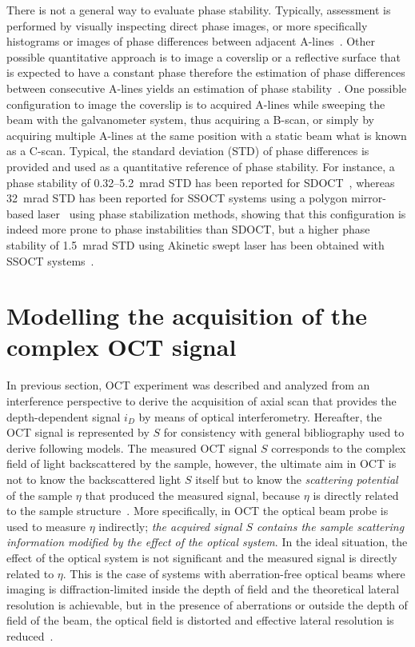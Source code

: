 There is not a general way to evaluate phase stability. Typically, assessment is performed by visually inspecting direct phase images, or more specifically histograms or images of phase differences between adjacent A-lines~\cite{Minneman2015_Akinetik}. Other possible quantitative approach is to image a coverslip or a reflective surface that is expected to have a constant phase therefore the estimation of phase differences between consecutive A-lines yields an estimation of phase stability~\cite{Minneman2015_Akinetik}. One possible configuration to image the coverslip is to acquired A-lines while sweeping the beam with the galvanometer system, thus acquiring a B-scan, or simply by acquiring multiple A-lines at the same position with a static beam what is known as a C-scan. Typical, the standard deviation (STD) of phase differences is provided and used as a quantitative reference of phase stability. For instance, a phase stability of 0.32–5.2~mrad STD has been reported for SDOCT~\cite{White2003_vivo, Joo2005_Spectraldomain}, whereas 32~mrad STD has been reported for SSOCT systems using a polygon mirror-based laser~\cite{Manapuram2009_Phasesensitive} using phase stabilization methods, showing that this configuration is indeed more prone to phase instabilities than SDOCT, but a higher phase stability of 1.5~mrad STD using Akinetic swept laser has been obtained with SSOCT systems~\cite{Choi2013_Phasesensitive}.

\section{Modelling the acquisition of the complex OCT signal}\label{Model}

In previous section, OCT experiment was described and analyzed from an interference perspective to derive the acquisition of axial scan that provides the depth-dependent signal $i_D$ by means of optical interferometry. Hereafter, the OCT signal is represented by $S$ for consistency with general bibliography used to derive following models. The measured OCT signal $S$ corresponds to the complex field of light backscattered by the sample, however, the ultimate aim in OCT is not to know the backscattered light $S$ itself but to know the \textit{scattering potential} of the sample $\eta$ that produced the measured signal, because $\eta$ is directly related to the sample structure~\cite{Ralston2006_Inverse}. More specifically, in OCT the optical beam probe is used to measure $\eta$ indirectly; \textit{the acquired signal $S$ contains the sample scattering information modified by the effect of the optical system}. In the ideal situation, the effect of the optical system is not significant and the measured signal is directly related to $\eta$. This is the case of systems with aberration-free optical beams where imaging is diffraction-limited inside the depth of field and the theoretical lateral resolution is achievable, but in the presence of aberrations or outside the depth of field of the beam, the optical field is distorted and effective lateral resolution is reduced~\cite{Ralston2006_Inverse}.

